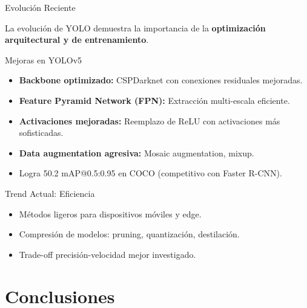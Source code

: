\documentclass[aspectratio=169, 10pt]{beamer}
\begin{document}
\begin{frame}{Evoluci\'on Reciente}

	La evoluci\'on de YOLO demuestra la importancia de la \textbf{optimizaci\'on arquitectural y de entrenamiento}.

	\vspace{0.3cm}

	\begin{block}{Mejoras en YOLOv5}
		\begin{itemize}
			\item \textbf{Backbone optimizado:} CSPDarknet con conexiones residuales mejoradas.
			\item \textbf{Feature Pyramid Network (FPN):} Extracci\'on multi-escala eficiente.
			\item \textbf{Activaciones mejoradas:} Reemplazo de ReLU con activaciones m\'as sofisticadas.
			\item \textbf{Data augmentation agresiva:} Mosaic augmentation, mixup.
			\item Logra 50.2 mAP@0.5:0.95 en COCO (competitivo con Faster R-CNN).
		\end{itemize}
	\end{block}

	\vspace{0.3cm}

	\begin{block}{Trend Actual: Eficiencia}
		\begin{itemize}
			\item M\'etodos ligeros para dispositivos m\'oviles y edge.
			\item Compresi\'on de modelos: pruning, quantizaci\'on, destilaci\'on.
			\item Trade-off precisi\'on-velocidad mejor investigado.
		\end{itemize}
	\end{block}

\end{frame}

\section{Conclusiones}
\end{document}
